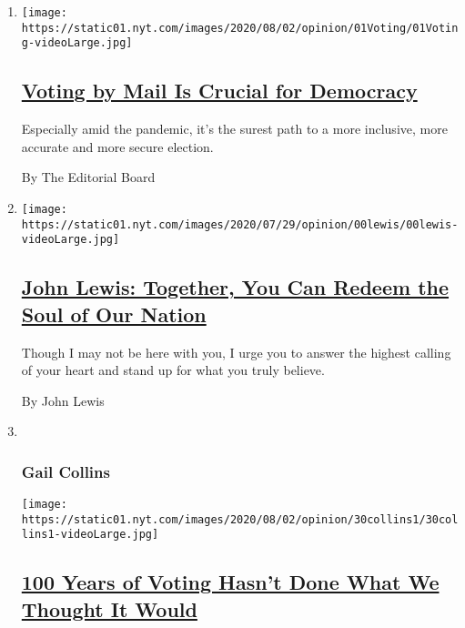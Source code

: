 \begin{enumerate}
\def\labelenumi{\arabic{enumi}.}
\item
  \texttt{[image: https://static01.nyt.com/images/2020/08/02/opinion/01Voting/01Voting-videoLarge.jpg]}

  \hypertarget{voting-by-mail-is-crucial-for-democracy}{%
  \subsection{\texorpdfstring{\href{/2020/08/01/opinion/sunday/mail-voting-covid-2020-election.html}{Voting
  by Mail Is Crucial for
  Democracy}}{Voting by Mail Is Crucial for Democracy}}\label{voting-by-mail-is-crucial-for-democracy}}

  Especially amid the pandemic, it's the surest path to a more
  inclusive, more accurate and more secure election.

  By The Editorial Board
\item
  \texttt{[image: https://static01.nyt.com/images/2020/07/29/opinion/00lewis/00lewis-videoLarge.jpg]}

  \hypertarget{john-lewis-together-you-can-redeem-the-soul-of-our-nation}{%
  \subsection{\texorpdfstring{\href{/2020/07/30/opinion/john-lewis-civil-rights-america.html}{John
  Lewis: Together, You Can Redeem the Soul of Our
  Nation}}{John Lewis: Together, You Can Redeem the Soul of Our Nation}}\label{john-lewis-together-you-can-redeem-the-soul-of-our-nation}}

  Though I may not be here with you, I urge you to answer the highest
  calling of your heart and stand up for what you truly believe.

  By John Lewis
\item ~
  \hypertarget{gail-collins}{%
  \subsubsection{Gail Collins}\label{gail-collins}}

  \texttt{[image: https://static01.nyt.com/images/2020/08/02/opinion/30collins1/30collins1-videoLarge.jpg]}

  \hypertarget{100-years-of-voting-hasnt-done-what-we-thought-it-would}{%
  \subsection{\texorpdfstring{\href{/2020/07/30/opinion/sunday/19th-amendment-women-suffrage.html}{100
  Years of Voting Hasn't Done What We Thought It
  Would}}{100 Years of Voting Hasn't Done What We Thought It Would}}\label{100-years-of-voting-hasnt-done-what-we-thought-it-would}}


\end{enumerate}
